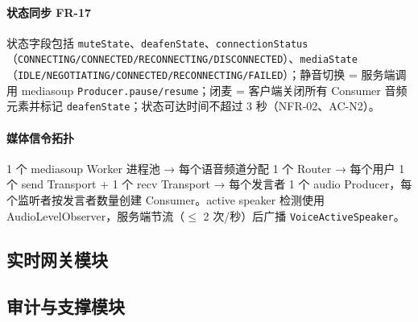 \paragraph{状态同步 FR-17}
状态字段包括 \texttt{muteState}、\texttt{deafenState}、\texttt{connectionStatus}（\texttt{CONNECTING/CONNECTED/RECONNECTING/DISCONNECTED}）、\texttt{mediaState}（\texttt{IDLE/NEGOTIATING/CONNECTED/RECONNECTING/FAILED}）；静音切换 = 服务端调用 mediasoup \texttt{Producer.pause/resume}；闭麦 = 客户端关闭所有 Consumer 音频元素并标记 \texttt{deafenState}；状态可达时间不超过 3 秒（NFR-02、AC-N2）。

\paragraph{媒体信令拓扑}
1 个 mediasoup Worker 进程池 → 每个语音频道分配 1 个 Router → 每个用户 1 个 send Transport + 1 个 recv Transport → 每个发言者 1 个 audio Producer，每个监听者按发言者数量创建 Consumer。active speaker 检测使用 AudioLevelObserver，服务端节流（$\leq$ 2 次/秒）后广播 \texttt{VoiceActiveSpeaker}。

\subsection{实时网关模块}


\subsection{审计与支撑模块}

